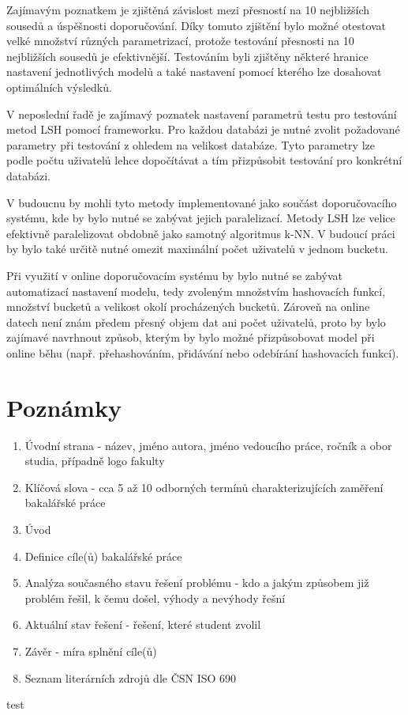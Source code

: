 \documentclass[11pt]{article}
\begin{document}
	Zajímavým poznatkem je zjištěná závislost mezi přesností na 10 nejbližších sousedů a úspěšnosti doporučování. Díky tomuto zjištění bylo možné otestovat velké množství různých parametrizací, protože testování přesnosti na 10 nejbližších sousedů je efektivnější. Testováním byli zjištěny některé hranice nastavení jednotlivých modelů a také nastavení pomocí kterého lze dosahovat optimálních výsledků.
	
	V neposlední řadě je zajímavý poznatek nastavení parametrů testu pro testování metod LSH pomocí frameworku. Pro každou databázi je nutné zvolit požadované parametry při testování z ohledem na velikost databáze. Tyto parametry lze podle počtu uživatelů lehce dopočítávat a tím přizpůsobit testování pro konkrétní databázi.
	
	V budoucnu by mohli tyto metody implementované jako součást doporučovacího systému, kde by bylo nutné se zabývat jejich paralelizací. Metody LSH lze velice efektivně paralelizovat obdobně jako samotný algoritmus k-NN. V budoucí práci by bylo také určitě nutné omezit maximální počet uživatelů v jednom bucketu.

Při využití v online doporučovacím systému by bylo nutné se zabývat automatizací nastavení modelu, tedy zvoleným množstvím hashovacích funkcí, množství bucketů a velikost okolí procházených bucketů. Zároveň na online datech není znám předem přesný objem dat ani počet uživatelů, proto by bylo zajímavé navrhnout způsob, kterým by bylo možné přizpůsobovat model při online běhu (např. přehashováním, přidávání nebo odebírání hashovacích funkcí). 
	
\section{Poznámky}

  \begin{enumerate}
\item Úvodní strana - název, jméno autora, jméno vedoucího práce, ročník a obor studia, případně logo fakulty
\item Klíčová slova - cca 5 až 10 odborných termínů charakterizujících zaměření bakalářské práce
\item Úvod 
\item Definice cíle(ů) bakalářské práce
\item Analýza současného stavu řešení problému - kdo a jakým způsobem již problém řešil, k čemu došel, výhody a nevýhody řešní
\item Aktuální stav řešení - řešení, které student zvolil
\item Závěr - míra splnění cíle(ů)
\item Seznam literárních zdrojů dle ČSN ISO 690
  \end{enumerate}
 
test\cite{guide}
\clearpage


\end{document}
